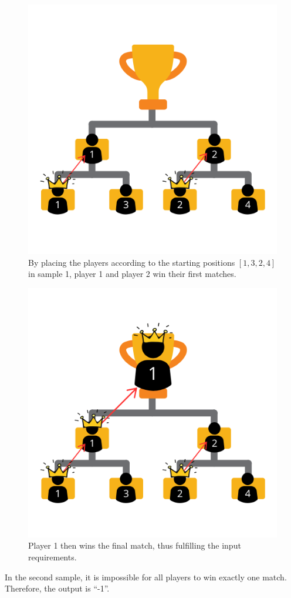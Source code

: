 \begin{centering}
  \begin{figure}[h]
      \centering
      \includegraphics[scale=0.7]{4.png}
    \caption{By placing the players according to the starting positions $[1, 3, 2, 4]$ in sample 1, player 1 and player 2 win their first matches.}
  \end{figure}
\end{centering}

\begin{centering}
  \begin{figure}[h]
      \centering
      \includegraphics[scale=0.7]{6.png}
    \caption{Player 1 then wins the final match, thus fulfilling the input requirements.}
  \end{figure}
\end{centering}


In the second sample, it is impossible for all players to win exactly one match. Therefore, the output is ``-1''.
